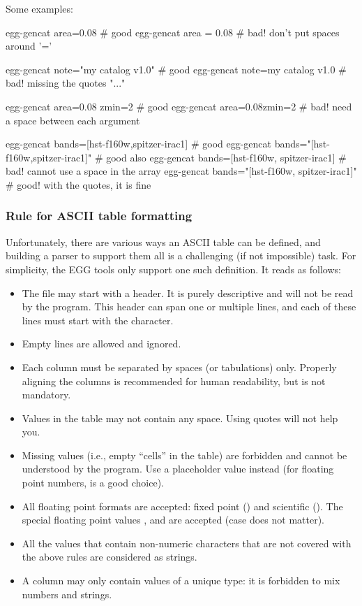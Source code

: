 \documentclass[12pt,a4paper]{article}
\newcommand{\egg}{\textsc{EGG}\xspace}
\begin{document}
Some examples:
\begin{bashcode}
egg-gencat area=0.08        # good
egg-gencat area = 0.08      # bad! don't put spaces around '='

egg-gencat note="my catalog v1.0" # good
egg-gencat note=my catalog v1.0   # bad! missing the quotes "..."

egg-gencat area=0.08 zmin=2 # good
egg-gencat area=0.08zmin=2  # bad! need a space between each argument

egg-gencat bands=[hst-f160w,spitzer-irac1]    # good
egg-gencat bands="[hst-f160w,spitzer-irac1]"  # good also
egg-gencat bands=[hst-f160w, spitzer-irac1]   # bad! cannot use a space in the array
egg-gencat bands="[hst-f160w, spitzer-irac1]" # good! with the quotes, it is fine
\end{bashcode}

\subsubsection{Rule for ASCII table formatting}

Unfortunately, there are various ways an ASCII table can be defined, and building a parser to support them all is a challenging (if not impossible) task. For simplicity, the \egg tools only support one such definition. It reads as follows:
\begin{itemize}
\item The file may start with a header. It is purely descriptive and will not be read by the program. This header can span one or multiple lines, and each of these lines must start with the  character.
\item Empty lines are allowed and ignored.
\item Each column must be separated by spaces (or tabulations) only. Properly aligning the columns is recommended for human readability, but is not mandatory.
\item Values in the table may not contain any space. Using quotes will not help you.
\item Missing values (i.e., empty ``cells'' in the table) are forbidden and cannot be understood by the program. Use a placeholder value instead (for floating point numbers,  is a good choice).
\item All floating point formats are accepted: fixed point () and scientific (). The special floating point values ,  and  are accepted (case does not matter).
\item All the values that contain non-numeric characters that are not covered with the above rules are considered as strings.
\item A column may only contain values of a unique type: it is forbidden to mix numbers and strings.
\end{itemize}
\end{document}
